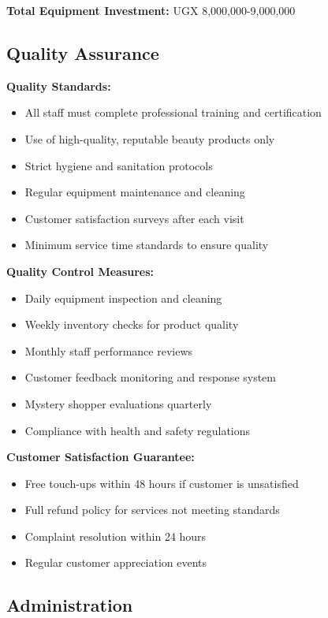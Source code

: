 \documentclass[a4paper,12pt]{article}
\begin{document}
\textbf{Total Equipment Investment:} UGX 8,000,000-9,000,000

\subsection{Quality Assurance}

\textbf{Quality Standards:}
\begin{itemize}[leftmargin=2em]
    \item All staff must complete professional training and certification
    \item Use of high-quality, reputable beauty products only
    \item Strict hygiene and sanitation protocols
    \item Regular equipment maintenance and cleaning
    \item Customer satisfaction surveys after each visit
    \item Minimum service time standards to ensure quality
\end{itemize}

\textbf{Quality Control Measures:}
\begin{itemize}[leftmargin=2em]
    \item Daily equipment inspection and cleaning
    \item Weekly inventory checks for product quality
    \item Monthly staff performance reviews
    \item Customer feedback monitoring and response system
    \item Mystery shopper evaluations quarterly
    \item Compliance with health and safety regulations
\end{itemize}

\textbf{Customer Satisfaction Guarantee:}
\begin{itemize}[leftmargin=2em]
    \item Free touch-ups within 48 hours if customer is unsatisfied
    \item Full refund policy for services not meeting standards
    \item Complaint resolution within 24 hours
    \item Regular customer appreciation events
\end{itemize}

\subsection{Administration}
\end{document}
